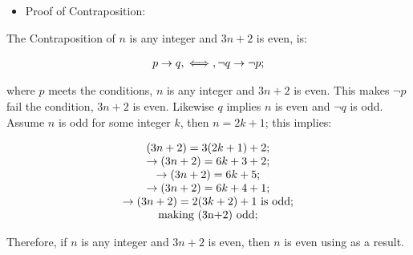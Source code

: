 \documentclass[11pt]{article}
\begin{document}
\begin{itemize}
	\item Proof of Contraposition:
\end{itemize}

The Contraposition of $n$ is any integer and $3n + 2$ is even, is:

\begin{displaymath}
\begin{tabular}{c}
$p \to q, \iff, \lnot q \to \lnot p;$ \\
\end{tabular}
\end{displaymath}

where $p$ meets the conditions, $n$ is any integer and $3n + 2$ is even. This makes $\lnot p$ fail the condition, $3n + 2$ is even. Likewise $q$ implies $n$ is even and $\lnot q$ is odd. Assume $n$ is odd for some integer $k$, then $n = 2k + 1$; this implies:

\begin{displaymath}
\begin{tabular}{c}
$(3n + 2) = 3(2k + 1) + 2;$ \\
$\to (3n + 2) = 6k + 3 + 2;$ \\
$\to (3n + 2) = 6k + 5;$ \\
$\to (3n + 2) = 6k + 4 + 1;$ \\
$\to (3n + 2) = 2(3k + 2) + 1$ is odd;\\
making (3n+2) odd;
\end{tabular}
\end{displaymath}

Therefore, if $n$ is any integer and $3n + 2$ is even, then $n$ is even using as a result.
\end{document}
